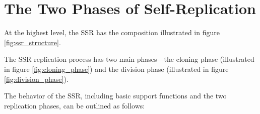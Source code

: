 \section{The Two Phases of Self-Replication}

At the highest level, the SSR has the composition 
illustrated in figure \ref{fig:ssr_structure}.


The SSR replication process has two main phases---the cloning phase (illustrated in figure \ref{fig:cloning_phase}) and the division phase (illustrated in figure \ref{fig:division_phase}).



The behavior of the SSR, including basic support functions and the two replication phases, can be outlined as follows:

